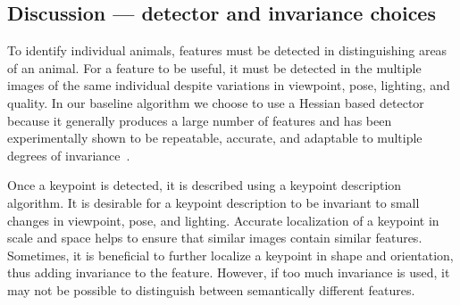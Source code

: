     \subsection{Discussion --- detector and invariance choices}
        To identify individual animals, features must be detected in
          distinguishing areas of an animal.
        For a feature to be useful, it must be detected in the multiple
          images of the same individual despite variations in viewpoint,
          pose, lighting, and quality.
        In our baseline algorithm we choose to use a Hessian based
          detector~\cite{perdoch_efficient_2009, lindeberg_feature_1998}
          because it generally produces a large number of features and
          has been experimentally shown to be repeatable, accurate, and
          adaptable to multiple degrees of
          invariance~\cite{tuytelaars_local_2007}.

        Once a keypoint is detected, it is described using a keypoint
          description algorithm.
        It is desirable for a keypoint description to be invariant to
          small changes in viewpoint, pose, and lighting.
        Accurate localization of a keypoint in scale and space helps to
          ensure that similar images contain similar features.
        Sometimes, it is beneficial to further localize a keypoint in
          shape and orientation, thus adding invariance to the feature.
        However, if too much invariance is used, it may not be possible
          to distinguish between semantically different features.

